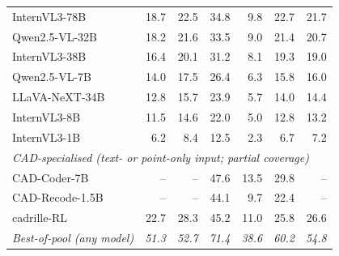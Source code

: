\begin{table}[t]
\begin{tabular}{lrrrrrr}
InternVL3-78B                & 18.7 & 22.5 & 34.8 & 9.8  & 22.7 & 21.7 \\
Qwen2.5-VL-32B               & 18.2 & 21.6 & 33.5 & 9.0  & 21.4 & 20.7 \\
InternVL3-38B                & 16.4 & 20.1 & 31.2 & 8.1  & 19.3 & 19.0 \\
Qwen2.5-VL-7B                & 14.0 & 17.5 & 26.4 & 6.3  & 15.8 & 16.0 \\
LLaVA-NeXT-34B               & 12.8 & 15.7 & 23.9 & 5.7  & 14.0 & 14.4 \\
InternVL3-8B                 & 11.5 & 14.6 & 22.0 & 5.0  & 12.8 & 13.2 \\
InternVL3-1B                 & 6.2  & 8.4  & 12.5 & 2.3  & 6.7  & 7.2  \\
\midrule
\multicolumn{7}{l}{\emph{CAD-specialised (text- or point-only input; partial coverage)}} \\
CAD-Coder-7B~\citep{Guan2025}        & --   & --   & 47.6 & 13.5 & 29.8 & --  \\
CAD-Recode-1.5B~\citep{Rukhovich2025} & --  & --   & 44.1 & 9.7  & 22.4 & --  \\
cadrille-RL~\citep{Kolodiazhnyi2026}  & 22.7 & 28.3 & 45.2 & 11.0 & 25.8 & 26.6 \\
\midrule
\textit{Best-of-pool (any model)} & \textit{51.3} & \textit{52.7} & \textit{71.4} & \textit{38.6} & \textit{60.2} & \textit{54.8} \\
\bottomrule
\end{tabular}
\end{table}
\fi

